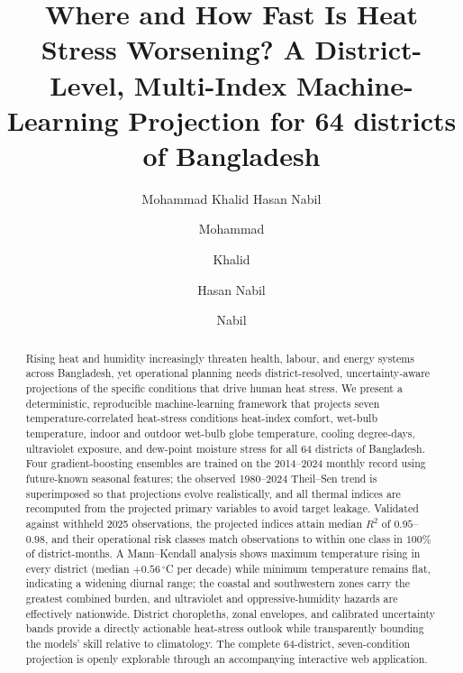 \documentclass[review,11pt]{elsarticle}
\begin{document}
\begin{frontmatter}

\title{Where and How Fast Is Heat Stress Worsening? A District-Level, Multi-Index
Machine-Learning Projection for 64 districts of Bangladesh }

\author[bup]{Mohammad Khalid Hasan Nabil}

\author[bup]{Mohammad} %
\author[bup]{Khalid} %
\author[bup]{Hasan Nabil} %
\author[bup]{Nabil} %



\begin{abstract}
Rising heat and humidity increasingly threaten health, labour, and energy systems
across Bangladesh, yet operational planning needs district-resolved,
uncertainty-aware projections of the specific conditions that drive human heat
stress. We present a deterministic, reproducible machine-learning framework that
projects seven temperature-correlated heat-stress conditions heat-index comfort,
wet-bulb temperature, indoor and outdoor wet-bulb globe temperature, cooling
degree-days, ultraviolet exposure, and dew-point moisture stress
for all 64
districts of Bangladesh. Four gradient-boosting ensembles are trained on the
2014--2024 monthly record using future-known seasonal features; the observed
1980--2024 Theil--Sen trend is superimposed so that projections evolve
realistically, and all thermal indices are recomputed from the projected primary
variables to avoid target leakage. Validated against withheld 2025 observations,
the projected indices attain median $R^{2}$ of $0.95$--$0.98$, and their
operational risk classes match observations to within one class in $100\%$ of
district-months. A Mann--Kendall analysis shows maximum temperature rising in
every district (median $+0.56\,^{\circ}$C per decade) while minimum temperature
remains flat, indicating a widening diurnal range; the coastal and southwestern
zones carry the greatest combined burden, and ultraviolet and oppressive-humidity
hazards are effectively nationwide. District choropleths, zonal envelopes, and
calibrated uncertainty bands provide a directly actionable heat-stress outlook
while transparently bounding the models' skill relative to climatology. The
complete 64-district, seven-condition projection is openly explorable through an
accompanying interactive web application.
\end{abstract}


\end{frontmatter}
\end{document}
